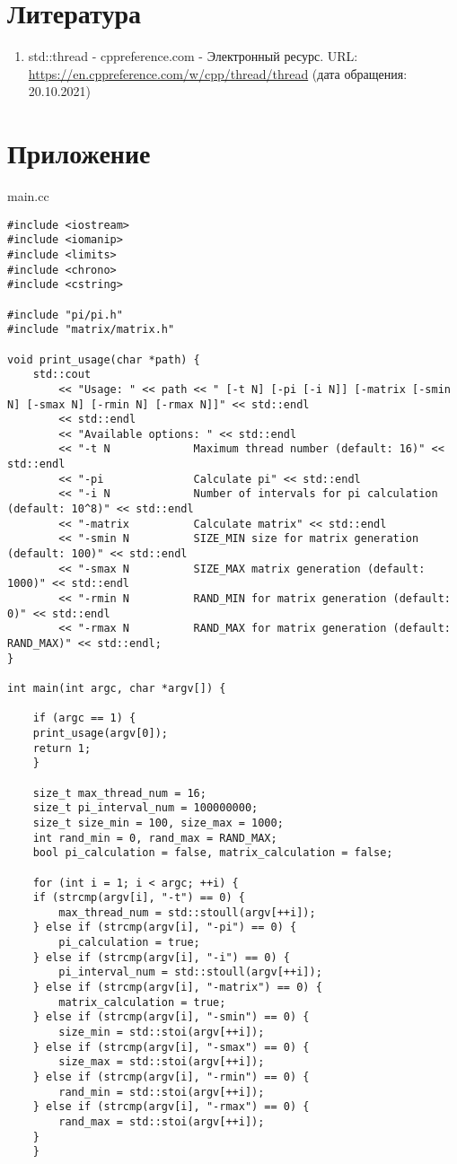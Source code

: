\documentclass{report}
\begin{document}
\section*{Литература}
\begin{enumerate}
\item std::thread - cppreference.com - Электронный ресурс. URL: \url{https://en.cppreference.com/w/cpp/thread/thread} (дата обращения: 20.10.2021)
\end{enumerate}
\clearpage

\section*{Приложение}
main.cc
\begin{lstlisting}
#include <iostream>
#include <iomanip>
#include <limits>
#include <chrono>
#include <cstring>

#include "pi/pi.h"
#include "matrix/matrix.h"

void print_usage(char *path) {
	std::cout
		<< "Usage: " << path << " [-t N] [-pi [-i N]] [-matrix [-smin N] [-smax N] [-rmin N] [-rmax N]]" << std::endl
		<< std::endl
		<< "Available options: " << std::endl
		<< "-t N             Maximum thread number (default: 16)" << std::endl
		<< "-pi              Calculate pi" << std::endl
		<< "-i N             Number of intervals for pi calculation (default: 10^8)" << std::endl
		<< "-matrix          Calculate matrix" << std::endl
		<< "-smin N          SIZE_MIN size for matrix generation (default: 100)" << std::endl
		<< "-smax N          SIZE_MAX matrix generation (default: 1000)" << std::endl
		<< "-rmin N          RAND_MIN for matrix generation (default: 0)" << std::endl
		<< "-rmax N          RAND_MAX for matrix generation (default: RAND_MAX)" << std::endl;
}

int main(int argc, char *argv[]) {

	if (argc == 1) {
	print_usage(argv[0]);
	return 1;
	}

	size_t max_thread_num = 16;
	size_t pi_interval_num = 100000000;
	size_t size_min = 100, size_max = 1000;
	int rand_min = 0, rand_max = RAND_MAX;
	bool pi_calculation = false, matrix_calculation = false;

	for (int i = 1; i < argc; ++i) {
	if (strcmp(argv[i], "-t") == 0) {
		max_thread_num = std::stoull(argv[++i]);
	} else if (strcmp(argv[i], "-pi") == 0) {
		pi_calculation = true;
	} else if (strcmp(argv[i], "-i") == 0) {
		pi_interval_num = std::stoull(argv[++i]);
	} else if (strcmp(argv[i], "-matrix") == 0) {
		matrix_calculation = true;
	} else if (strcmp(argv[i], "-smin") == 0) {
		size_min = std::stoi(argv[++i]);
	} else if (strcmp(argv[i], "-smax") == 0) {
		size_max = std::stoi(argv[++i]);
	} else if (strcmp(argv[i], "-rmin") == 0) {
		rand_min = std::stoi(argv[++i]);
	} else if (strcmp(argv[i], "-rmax") == 0) {
		rand_max = std::stoi(argv[++i]);
	}
	}


\end{lstlisting}
\end{document}

